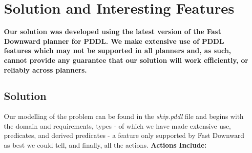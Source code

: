 \documentclass[11pt, oneside]{article}   	%
\begin{document}
\maketitle
\section{Solution and Interesting Features}
\textbf{ Our solution was developed using the latest version of the Fast Downward planner for PDDL. We make extensive use of PDDL features which may not be supported in all planners and, as such, cannot provide any guarantee that our solution will work efficiently, or reliably across planners.}
\subsection{Solution}
Our modelling of the problem can be found in the \textit{ship.pddl} file and begins with the domain and requirements, types - of which we have made extensive use, predicates, and derived predicates - a feature only supported by Fast Downward as best we could tell, and finally, all the actions. \newline
\textbf{Actions Include: }\\
\end{document}
